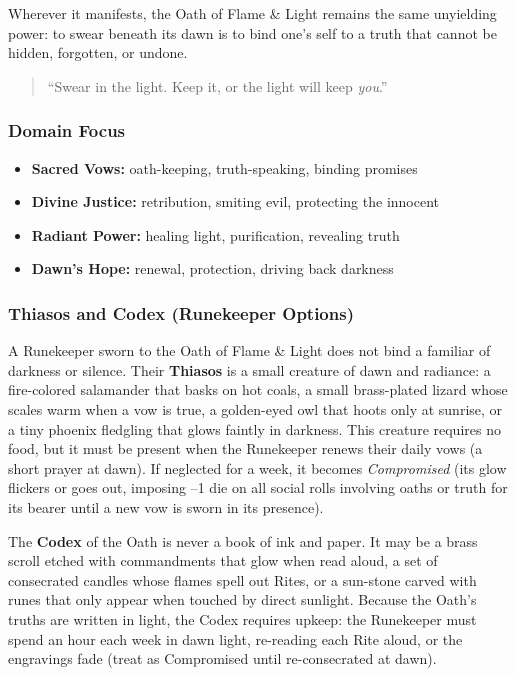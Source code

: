 Wherever it manifests, the Oath of Flame \& Light remains the same unyielding power: to swear beneath its dawn is to bind one's self to a truth that cannot be hidden, forgotten, or undone.

\begin{quote}
``Swear in the light. Keep it, or the light will keep \emph{you}.''
\end{quote}

\subsubsection*{Domain Focus}
\begin{itemize}
  \item \textbf{Sacred Vows:} oath-keeping, truth-speaking, binding promises
  \item \textbf{Divine Justice:} retribution, smiting evil, protecting the innocent
  \item \textbf{Radiant Power:} healing light, purification, revealing truth
  \item \textbf{Dawn's Hope:} renewal, protection, driving back darkness
\end{itemize}

\subsubsection*{Thiasos and Codex (Runekeeper Options)}

A Runekeeper sworn to the Oath of Flame \& Light does not bind a familiar of darkness or silence. Their \textbf{Thiasos} is a small creature of dawn and radiance: a fire-colored salamander that basks on hot coals, a small brass-plated lizard whose scales warm when a vow is true, a golden-eyed owl that hoots only at sunrise, or a tiny phoenix fledgling that glows faintly in darkness. This creature requires no food, but it must be present when the Runekeeper renews their daily vows (a short prayer at dawn). If neglected for a week, it becomes \textit{Compromised} (its glow flickers or goes out, imposing --1 die on all social rolls involving oaths or truth for its bearer until a new vow is sworn in its presence).

The \textbf{Codex} of the Oath is never a book of ink and paper. It may be a brass scroll etched with commandments that glow when read aloud, a set of consecrated candles whose flames spell out Rites, or a sun-stone carved with runes that only appear when touched by direct sunlight. Because the Oath's truths are written in light, the Codex requires upkeep: the Runekeeper must spend an hour each week in dawn light, re-reading each Rite aloud, or the engravings fade (treat as Compromised until re-consecrated at dawn).

